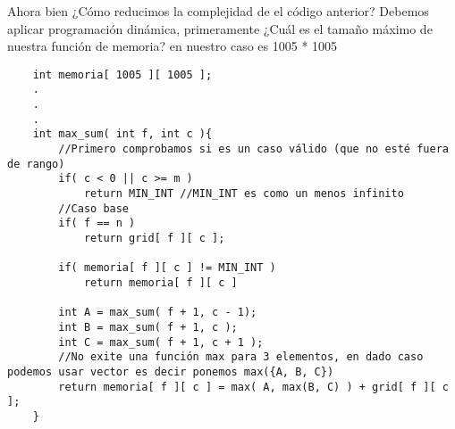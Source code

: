 Ahora bien ¿Cómo reducimos la complejidad de el código anterior? Debemos aplicar programación dinámica, primeramente ¿Cuál es el tamaño máximo de nuestra función de memoria? en nuestro caso es 1005 * 1005

\begin{lstlisting}
    int memoria[ 1005 ][ 1005 ];
    .
    .
    .
    int max_sum( int f, int c ){
        //Primero comprobamos si es un caso válido (que no esté fuera de rango)
        if( c < 0 || c >= m )
            return MIN_INT //MIN_INT es como un menos infinito
        //Caso base
        if( f == n )
            return grid[ f ][ c ];

        if( memoria[ f ][ c ] != MIN_INT )
            return memoria[ f ][ c ]

        int A = max_sum( f + 1, c - 1);
        int B = max_sum( f + 1, c );
        int C = max_sum( f + 1, c + 1 );
        //No exite una función max para 3 elementos, en dado caso podemos usar vector es decir ponemos max({A, B, C})
        return memoria[ f ][ c ] = max( A, max(B, C) ) + grid[ f ][ c ];
    }
\end{lstlisting}